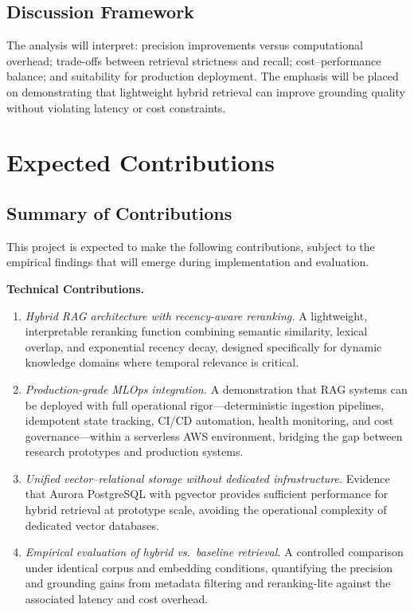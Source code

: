 \documentclass[12pt,a4paper]{report}
\begin{document}
\section{Discussion Framework}
\label{sec:discussion}

The analysis will interpret: precision improvements versus computational overhead; trade-offs between retrieval strictness and recall; cost--performance balance; and suitability for production deployment. The emphasis will be placed on demonstrating that lightweight hybrid retrieval can improve grounding quality without violating latency or cost constraints.

\chapter{Expected Contributions}

\section{Summary of Contributions}
\label{sec:contributions}

This project is expected to make the following contributions, subject to the empirical findings that will emerge during implementation and evaluation.

\textbf{Technical Contributions.}

\begin{enumerate}[leftmargin=0.5in]
  \item \textit{Hybrid RAG architecture with recency-aware reranking.} A lightweight, interpretable reranking function combining semantic similarity, lexical overlap, and exponential recency decay, designed specifically for dynamic knowledge domains where temporal relevance is critical.

  \item \textit{Production-grade MLOps integration.} A demonstration that RAG systems can be deployed with full operational rigor—deterministic ingestion pipelines, idempotent state tracking, CI/CD automation, health monitoring, and cost governance—within a serverless AWS environment, bridging the gap between research prototypes and production systems.

  \item \textit{Unified vector--relational storage without dedicated infrastructure.} Evidence that Aurora PostgreSQL with pgvector provides sufficient performance for hybrid retrieval at prototype scale, avoiding the operational complexity of dedicated vector databases.

  \item \textit{Empirical evaluation of hybrid vs.\ baseline retrieval.} A controlled comparison under identical corpus and embedding conditions, quantifying the precision and grounding gains from metadata filtering and reranking-lite against the associated latency and cost overhead.
\end{enumerate}
\end{document}

